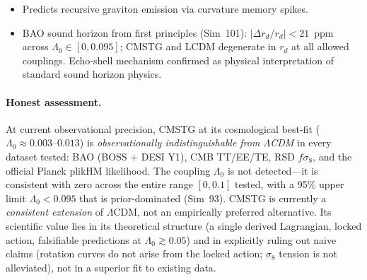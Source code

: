 \documentclass[12pt,a4paper]{article}
\begin{document}
\begin{itemize}
  \item Predicts recursive graviton emission via curvature memory spikes.
  \item BAO sound horizon from first principles (Sim~101): $|\Delta r_d/r_d| < 21$~ppm across $\Lambda_0 \in [0, 0.095]$; CMSTG and LCDM degenerate in $r_d$ at all allowed couplings. Echo-shell mechanism confirmed as physical interpretation of standard sound horizon physics.
\end{itemize}

\paragraph{Honest assessment.}
At current observational precision, CMSTG at its cosmological best-fit
($\Lambda_0 \approx 0.003$--$0.013$) is \emph{observationally indistinguishable
from $\Lambda$CDM} in every dataset tested: BAO (BOSS + DESI Y1), CMB TT/EE/TE,
RSD $f\sigma_8$, and the official Planck plikHM likelihood.  The coupling
$\Lambda_0$ is not detected---it is consistent with zero across the entire
range $[0, 0.1]$ tested, with a 95\% upper limit $\Lambda_0 < 0.095$ that
is prior-dominated (Sim~93).  CMSTG is currently a \emph{consistent extension}
of $\Lambda$CDM, not an empirically preferred alternative.  Its scientific
value lies in its theoretical structure (a single derived Lagrangian, locked
action, falsifiable predictions at $\Lambda_0 \gtrsim 0.05$) and in explicitly
ruling out naive claims (rotation curves do not arise from the locked action;
$\sigma_8$ tension is not alleviated), not in a superior fit to existing data.
\end{document}
